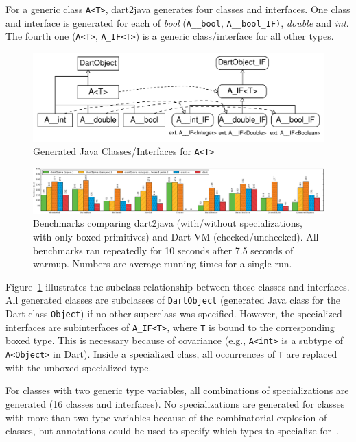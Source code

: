 \documentclass[sigplan]{acmart}
\begin{document}
For a generic class \texttt{A<T>}, dart2java generates four classes and interfaces. One class and interface is generated for each of \emph{bool} (\texttt{A\_\_bool}, \texttt{A\_\_bool\_IF)}, \emph{double} and \emph{int}. The fourth one (\texttt{A<T>},  \texttt{A\_IF<T>}) is a generic class/interface for all other types.

\begin{figure}[!htp]
	\includegraphics[width=\columnwidth]{generic_spec_classes.pdf}
    \caption{Generated Java Classes/Interfaces for \texttt{A<T>}}
    \label{fig:generic_spec_classes}
\end{figure}
\begin{figure}[!t]
\includegraphics[width=\textwidth]{benchmark_plot.pdf}
\caption{Benchmarks comparing dart2java (with/without specializations, with only boxed primitives) and Dart VM (checked/unchecked). All benchmarks ran repeatedly for 10 seconds after 7.5 seconds of warmup. Numbers are average running times for a single run.}
\label{fig:benchmarks}
\end{figure}

Figure~\ref{fig:generic_spec_classes} illustrates the subclass relationship between those classes and interfaces. All generated classes are subclasses of \texttt{DartObject} (generated Java class for the Dart class \texttt{Object}) if no other superclass was specified. However, the specialized interfaces are subinterfaces of \texttt{A\_IF<T>}, where \texttt{T} is bound to the corresponding boxed type. This is necessary because of covariance (e.g., \texttt{A<int>} is a subtype of \texttt{A<Object>} in Dart). Inside a specialized class, all occurrences of \texttt{T} are replaced with the unboxed specialized type.

For classes with two generic type variables, all combinations of specializations are generated (16 classes and interfaces). No specializations are generated for classes with more than two type variables because of the combinatorial explosion of classes, but annotations could be used to specify which types to specialize for~\cite{Dragos:2009:CGT:1565824.1565830}. 
\end{document}
